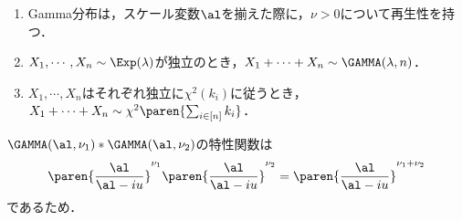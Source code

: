 \documentclass[uplatex,dvipdfmx]{jsarticle}
\begin{document}
\begin{proposition}[Gamma分布の再生性]\mbox{}\label{prop-reproductivity-of-Gamma-distribution}
    \begin{enumerate}
        \item Gamma分布は，スケール変数$\al$を揃えた際に，$\nu>0$について再生性を持つ．
        \item $X_1,\cdots,X_n\sim\Exp(\lambda)$が独立のとき，$X_1+\cdots+X_n\sim\GAMMA(\lambda,n)$．
        \item $X_1,\cdots,X_n$はそれぞれ独立に$\chi^2(k_i)$に従うとき，$X_1+\cdots+X_n\sim\chi^2\paren{\sum_{i\in[n]}k_i}$．
    \end{enumerate}
\end{proposition}
\begin{Proof}
    $\GAMMA(\al,\nu_1)*\GAMMA(\al,\nu_2)$の特性関数は
    \[\paren{\frac{\al}{\al-iu}}^{\nu_1}\paren{\frac{\al}{\al-iu}}^{\nu_2}=\paren{\frac{\al}{\al-iu}}^{\nu_1+\nu_2}\]
    であるため．
\end{Proof}


\end{document}
